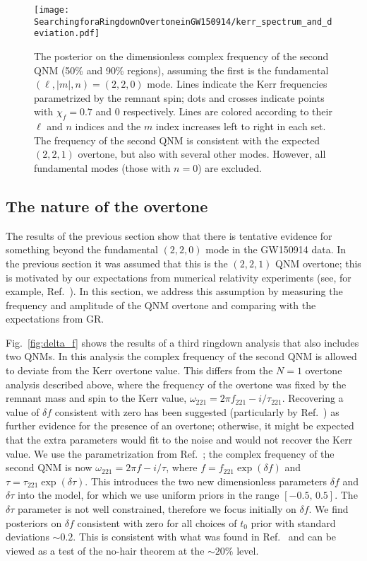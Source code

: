 \begin{figure}[b]
	\texttt{[image: SearchingforaRingdownOvertoneinGW150914/kerr\_spectrum\_and\_deviation.pdf]}
	\caption[Posterior on the dimensionless complex frequency of the second GW150914 QNM assuming the first is the fundamental mode]{ 
		The posterior on the dimensionless complex frequency of the second QNM (50\% and 90\% regions), assuming the first is the fundamental $(\ell,|m|,n)=(2,2,0)$ mode.
		Lines indicate the Kerr frequencies parametrized by the remnant spin; dots and crosses indicate points with $\chi_f=0.7$ and $0$ respectively.
		Lines are colored according to their $\ell$ and $n$ indices and the $m$ index increases left to right in each set.
		The frequency of the second QNM is consistent with the expected $(2,2,1)$ overtone, but also with several other modes.
		However, all fundamental modes (those with $n=0$) are excluded.
	}
	\label{fig:other_QNMs}
\end{figure}


\subsection{The nature of the overtone}\label{subsec:verify}

The results of the previous section show that there is tentative evidence for something beyond the fundamental $(2,2,0)$ mode in the GW150914 data. 
In the previous section it was assumed that this is the $(2,2,1)$ QNM overtone; this is motivated by our expectations from numerical relativity experiments (see, for example, Ref.~\cite{Giesler:2019uxc}). 
In this section, we address this assumption by measuring the frequency and amplitude of the QNM overtone and comparing with the expectations from GR.

Fig.~\ref{fig:delta_f} shows the results of a third ringdown analysis that also includes two QNMs.
In this analysis the complex frequency of the second QNM is allowed to deviate from the Kerr overtone value. 
This differs from the $N=1$ overtone analysis described above, where the frequency of the overtone was fixed by the remnant mass and spin to the Kerr value, $\omega_{221} = 2\pi f_{221} - i/\tau_{221}$.
Recovering a value of $\delta f$ consistent with zero has been suggested (particularly by Ref.~\cite{Isi:2022mhy}) as further evidence for the presence of an overtone; otherwise, it might be expected that the extra parameters would fit to the noise and would not recover the Kerr value.
We use the parametrization from Ref.~\cite{Isi:2022mhy}; the complex frequency of the second QNM is now $\omega_{221} = 2\pi f-i/\tau$, where $f=f_{221}\exp(\delta f)$ and $\tau=\tau_{221}\exp(\delta \tau)$. 
This introduces the two new dimensionless parameters $\delta f$ and $\delta \tau$ into the model, for which we use uniform priors in the range $[-0.5,\, 0.5]$.
The $\delta \tau$ parameter is not well constrained, therefore we focus initially on $\delta f$.
We find posteriors on $\delta f$ consistent with zero for all choices of $t_0$ prior with standard deviations $\sim 0.2$. 
This is consistent with what was found in Ref.~\cite{Isi:2019aib} and can be viewed as a test of the no-hair theorem at the $\sim 20\%$ level.

